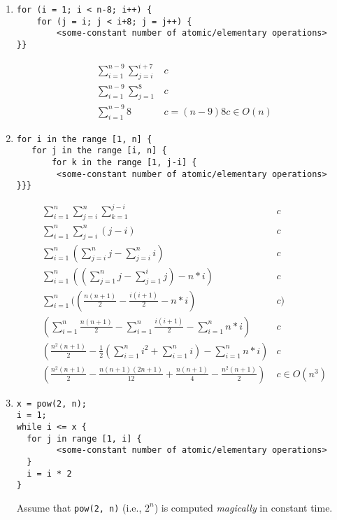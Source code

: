 \documentclass[11pt]{article}
\begin{document}
\begin{enumerate}
\begin{enumerate}
            \item
            \begin{verbatim}
for (i = 1; i < n-8; i++) {
    for (j = i; j < i+8; j = j++) {
        <some-constant number of atomic/elementary operations>
}}
            \end{verbatim}
            \begin{align*}
                \sum_{i=1}^{n - 9} \sum_{j = i}^{i + 7} &c \\
                \sum_{i=1}^{n - 9} \sum_{j = 1}^{8} &c \\
                \sum_{i=1}^{n - 9} 8&c = (n - 9)8c \in O(n)
            \end{align*}

            \item
            \begin{verbatim}
for i in the range [1, n] {
   for j in the range [i, n] {
       for k in the range [1, j-i] {
        <some-constant number of atomic/elementary operations>
}}}
            \end{verbatim}
            \begin{align*}
                      \sum_{i=1}^{n} \sum_{j = i}^{n} \sum_{k = 1}^{j - i} &c \\
                      \sum_{i=1}^{n} \sum_{j = i}^{n} (j - i) &c \\
                      \sum_{i=1}^{n} (\sum_{j = i}^{n} j - \sum_{j = i}^{n} i) &c \\
                      \sum_{i=1}^{n} ((\sum_{j = 1}^{n} j - \sum_{j = 1}^{i} j) - n*i) &c \\
                      \sum_{i=1}^{n} ((\frac{n(n + 1)}{2} - \frac{i(i + 1)}{2} - n*i) &c) \\
                       (\sum_{i=1}^{n} \frac{n(n + 1)}{2} - \sum_{i=1}^{n} \frac{i(i + 1)}{2} - \sum_{i=1}^{n} n*i) &c \\
                       ( \frac{n^2(n + 1)}{2} - \frac{1}{2} (\sum_{i=1}^{n} i^2 + \sum_{i=1}^{n}i ) - \sum_{i=1}^{n} n*i) &c \\
                       ( \frac{n^2(n + 1)}{2} - \frac{n(n + 1)(2n + 1)}{12} + \frac{n(n + 1)}{4} - \frac{n^2(n + 1)}{2}) &c \in O(n^3)
            \end{align*}

            \item
            \begin{verbatim}
x = pow(2, n);
i = 1;
while i <= x {
  for j in range [1, i] {
        <some-constant number of atomic/elementary operations>
  }
  i = i * 2
}
            \end{verbatim}
            Assume that \texttt{pow(2, n)} (i.e., $2^n$)  is computed \emph{magically} in
            constant time.


\end{enumerate}
\end{enumerate}
\end{document}
